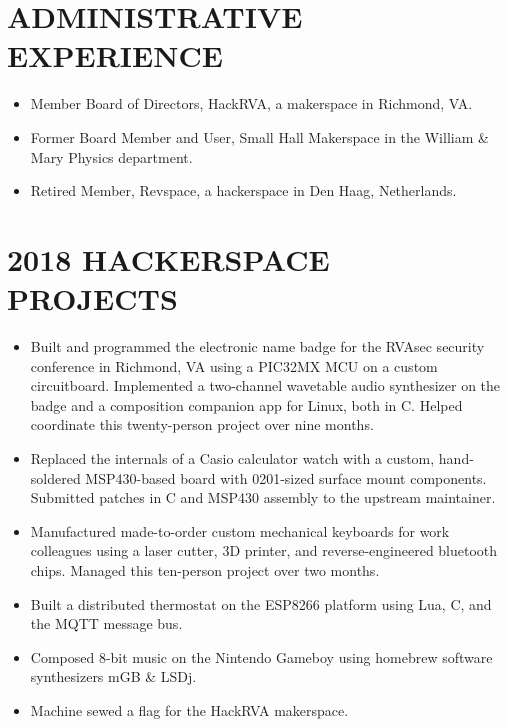 \documentclass{res}     %
\begin{document}
\begin{resume}
\section{ADMINISTRATIVE EXPERIENCE}
\vspace{5mm}
\begin{itemize}[leftmargin=5mm]
\item Member Board of Directors, HackRVA, a makerspace in Richmond, VA.
\item Former Board Member and User, Small Hall Makerspace in the William \& Mary Physics department.
\item Retired Member, Revspace, a hackerspace in Den Haag, Netherlands.
\end{itemize}

\section{2018 HACKERSPACE PROJECTS}
\vspace{5mm}
\begin{itemize}[leftmargin=5mm]
\item Built and programmed the electronic name badge for the RVAsec security conference in Richmond, VA using a PIC32MX MCU on a custom circuitboard. Implemented a two-channel wavetable audio synthesizer on the badge and a composition companion app for Linux, both in C. Helped coordinate this twenty-person project over nine months.
\item Replaced the internals of a Casio calculator watch with a custom, hand-soldered MSP430-based board with 0201-sized surface mount components. Submitted patches in C and MSP430 assembly to the upstream maintainer.
\item Manufactured made-to-order custom mechanical keyboards for work colleagues using a laser cutter, 3D printer, and reverse-engineered bluetooth chips. Managed this ten-person project over two months.
\item Built a distributed thermostat on the ESP8266 platform using Lua, C, and the MQTT message bus.
\item Composed 8-bit music on the Nintendo Gameboy using homebrew software synthesizers mGB \& LSDj.
\item Machine sewed a flag for the HackRVA makerspace.
\end{itemize}


\end{resume}
\end{document}
